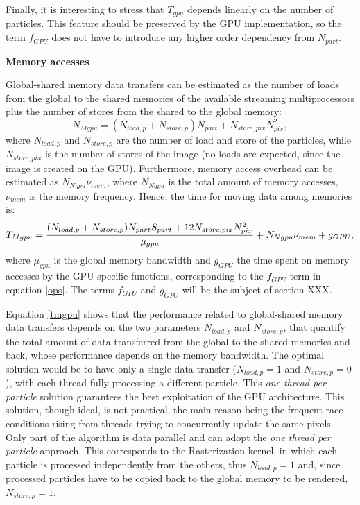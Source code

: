 \documentclass[11pt]{article}
\begin{document}
Finally, it is interesting to stress that $T_{gpu}$ depends linearly on the number of particles. 
This feature should be preserved by the GPU implementation, so the term 
$f_{GPU}$ does not have to introduce any higher order dependency from $N_{part}$. 

\medskip
\noindent
{\bf Memory accesses}

Global-shared memory data transfers can be estimated 
as the number of loads from the global to the shared memories of the available 
streaming multiprocessors plus the number of stores from the shared to the global memory: 
\begin{equation}
N_{Mgpu} = (N_{load,p} + N_{store,p}) N_{part} + N_{store,pix} N_{pix}^2,
\end{equation}
where $N_{load,p}$ and $N_{store,p}$ are the number of load and store of the 
particles, while $N_{store,pix}$ is the number of stores of the image (no loads 
are expected, since the image is created on the GPU). 
Furthermore, memory access overhead can be estimated as $N_{Ngpu} \nu_{mem}$,
where $N_{Ngpu}$ is the total amount of memory accesses, $\nu_{mem}$
is the memory frequency. 
Hence, the time for moving data among memories is:
\begin{equation}\label{tmgpu}
T_{Mgpu} = {(N_{load,p} + N_{store,p}) N_{part} S_{part}
+ 12 N_{store,pix} N_{pix}^2\over \mu_{gpu}}
+ N_{Ngpu} \nu_{mem} + g_{GPU},
\end{equation}
where $\mu_{gpu}$ is the global memory bandwidth
and $g_{GPU}$ the time 
spent on memory accesses by the GPU specific
functions, corresponding to the $f_{GPU}$ term in equation \eqref{ops}.
The terms $f_{GPU}$ and $g_{GPU}$ will be the subject of section XXX.

Equation \eqref{tmgpu} shows that the performance related to global-shared memory 
data transfers
depends on the two parameters $N_{load,p}$ and $N_{store,p}$, that quantify the
total amount of data transferred from the global to the shared memories 
and back, whose performance depends on the memory bandwidth.
The optimal solution would be to have only a single data transfer
($N_{load,p} = 1$ and $N_{store,p} = 0$), with each thread
fully processing a different particle. This {\it one thread per particle} solution guarantees
the best exploitation of the GPU architecture.
This solution, though ideal, is not practical, the main reason being the frequent race conditions
rising from threads trying to concurrently update the same pixels.
Only part of the algorithm is data parallel and can adopt the {\it one thread per particle}
approach. This corresponds to the Rasterization kernel, in which each particle
is processed independently from the others, thus
$N_{load,p} = 1$ and, since processed particles
have to be copied back to the global memory to be rendered, $N_{store,p} = 1$.
\end{document}

